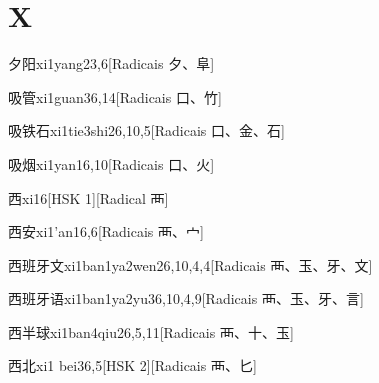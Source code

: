 
\section*{X}

\begin{entry}{夕阳}{xi1yang2}{3,6}[Radicais ⼣、⾩]
\end{entry}

\begin{entry}{吸管}{xi1guan3}{6,14}[Radicais ⼝、⽵]
\end{entry}

\begin{entry}{吸铁石}{xi1tie3shi2}{6,10,5}[Radicais ⼝、⾦、⽯]
\end{entry}

\begin{entry}{吸烟}{xi1yan1}{6,10}[Radicais ⼝、⽕]
\end{entry}

\begin{entry}{西}{xi1}{6}[HSK 1][Radical ⾑]
\end{entry}

\begin{entry}{西安}{xi1'an1}{6,6}[Radicais ⾑、⼧]
\end{entry}

\begin{entry}{西班牙文}{xi1ban1ya2wen2}{6,10,4,4}[Radicais ⾑、⽟、⽛、⽂]
\end{entry}

\begin{entry}{西班牙语}{xi1ban1ya2yu3}{6,10,4,9}[Radicais ⾑、⽟、⽛、⾔]
\end{entry}

\begin{entry}{西半球}{xi1ban4qiu2}{6,5,11}[Radicais ⾑、⼗、⽟]
\end{entry}

\begin{entry}{西北}{xi1 bei3}{6,5}[HSK 2][Radicais ⾑、⼔]
\end{entry}

